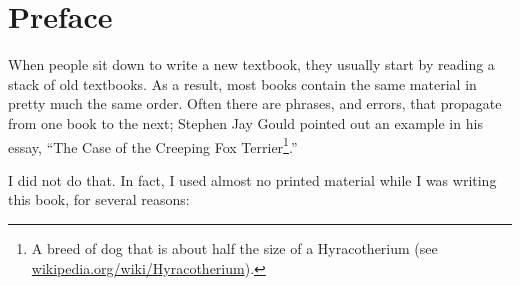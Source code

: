 \documentclass[12pt]{book}
\begin{document}
\chapter{Preface}
\label{preface}













When people sit down to write a new textbook, they usually start by
reading a stack of old textbooks.  As a result, most books
contain the same material in pretty much the same order.  Often there
are phrases, and errors, that propagate from one book to the next;
Stephen Jay Gould pointed out an example in his essay, ``The Case of
the Creeping Fox Terrier\footnote{A breed of dog that is about half
  the size of a Hyracotherium (see
  \url{wikipedia.org/wiki/Hyracotherium}).}.''

I did not do that.  In fact, I used almost no printed material while I
was writing this book, for several reasons:
\end{document}

